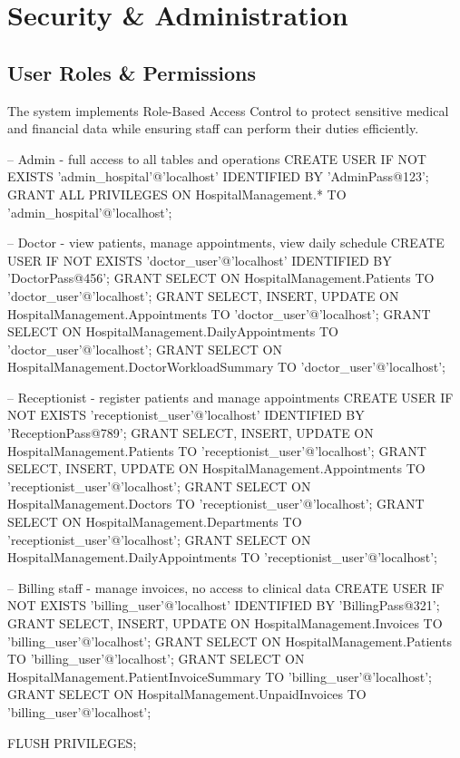\section{Security \& Administration}

\subsection{User Roles \& Permissions}
The system implements Role-Based Access Control to protect sensitive medical and financial data while ensuring staff can perform their duties efficiently.

\begin{sqlcode}
-- Admin - full access to all tables and operations
CREATE USER IF NOT EXISTS 'admin_hospital'@'localhost' IDENTIFIED BY 'AdminPass@123';
GRANT ALL PRIVILEGES ON HospitalManagement.* TO 'admin_hospital'@'localhost';

-- Doctor - view patients, manage appointments, view daily schedule
CREATE USER IF NOT EXISTS 'doctor_user'@'localhost' IDENTIFIED BY 'DoctorPass@456';
GRANT SELECT ON HospitalManagement.Patients TO 'doctor_user'@'localhost';
GRANT SELECT, INSERT, UPDATE  ON HospitalManagement.Appointments TO 'doctor_user'@'localhost';
GRANT SELECT ON HospitalManagement.DailyAppointments TO 'doctor_user'@'localhost';
GRANT SELECT ON HospitalManagement.DoctorWorkloadSummary TO 'doctor_user'@'localhost';

-- Receptionist - register patients and manage appointments
CREATE USER IF NOT EXISTS 'receptionist_user'@'localhost' IDENTIFIED BY 'ReceptionPass@789';
GRANT SELECT, INSERT, UPDATE  ON HospitalManagement.Patients TO 'receptionist_user'@'localhost';
GRANT SELECT, INSERT, UPDATE  ON HospitalManagement.Appointments TO 'receptionist_user'@'localhost';
GRANT SELECT ON HospitalManagement.Doctors TO 'receptionist_user'@'localhost';
GRANT SELECT ON HospitalManagement.Departments TO 'receptionist_user'@'localhost';
GRANT SELECT ON HospitalManagement.DailyAppointments TO 'receptionist_user'@'localhost';

-- Billing staff - manage invoices, no access to clinical data
CREATE USER IF NOT EXISTS 'billing_user'@'localhost' IDENTIFIED BY 'BillingPass@321';
GRANT SELECT, INSERT, UPDATE  ON HospitalManagement.Invoices TO 'billing_user'@'localhost';
GRANT SELECT ON HospitalManagement.Patients TO 'billing_user'@'localhost';
GRANT SELECT ON HospitalManagement.PatientInvoiceSummary TO 'billing_user'@'localhost';
GRANT SELECT ON HospitalManagement.UnpaidInvoices TO 'billing_user'@'localhost';

FLUSH PRIVILEGES;
\end{sqlcode}

